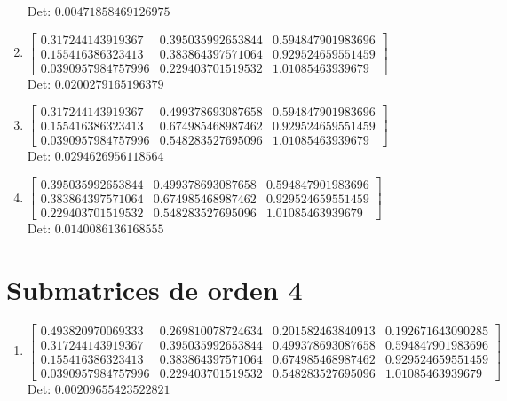 \documentclass[12pt]{article}
\begin{document}
\begin{enumerate}
Det: $0.00471858469126975$\\

\item $\displaystyle \left[\begin{matrix}0.317244143919367 & 0.395035992653844 & 0.594847901983696\\0.155416386323413 & 0.383864397571064 & 0.929524659551459\\0.0390957984757996 & 0.229403701519532 & 1.01085463939679\end{matrix}\right]$\\

Det: $0.0200279165196379$\\

\item $\displaystyle \left[\begin{matrix}0.317244143919367 & 0.499378693087658 & 0.594847901983696\\0.155416386323413 & 0.674985468987462 & 0.929524659551459\\0.0390957984757996 & 0.548283527695096 & 1.01085463939679\end{matrix}\right]$\\

Det: $0.0294626956118564$\\

\item $\displaystyle \left[\begin{matrix}0.395035992653844 & 0.499378693087658 & 0.594847901983696\\0.383864397571064 & 0.674985468987462 & 0.929524659551459\\0.229403701519532 & 0.548283527695096 & 1.01085463939679\end{matrix}\right]$\\

Det: $0.0140086136168555$\\

\end{enumerate}


\section*{Submatrices de orden 4}

\begin{enumerate}

\item $\displaystyle \left[\begin{matrix}0.493820970069333 & 0.269810078724634 & 0.201582463840913 & 0.192671643090285\\0.317244143919367 & 0.395035992653844 & 0.499378693087658 & 0.594847901983696\\0.155416386323413 & 0.383864397571064 & 0.674985468987462 & 0.929524659551459\\0.0390957984757996 & 0.229403701519532 & 0.548283527695096 & 1.01085463939679\end{matrix}\right]$\\

Det: $0.00209655423522821$\\

\end{enumerate}
\end{document}
